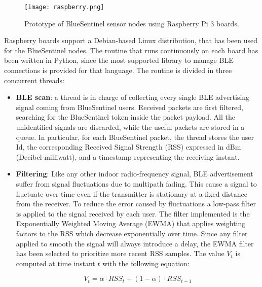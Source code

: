 \begin{figure}[h!tb]
\centering
\texttt{[image: raspberry.png]}
\caption[Prototype of BlueSentinel sensor nodes using Raspberry Pi 3 boards.]{Prototype of BlueSentinel sensor nodes using Raspberry Pi 3 boards.}
\label{fig:raspberry}
\end{figure}

Raspberry boards support a Debian-based Linux distribution, that has been used for the BlueSentinel nodes. The routine that runs continuously on each board has been written in Python, since the most supported library to manage BLE connections is provided for that language. The routine is divided in three concurrent threads:

\begin{itemize}
\item \textbf{BLE scan}: a thread is in charge of collecting every single BLE advertising signal coming from BlueSentinel users. Received packets are first filtered, searching for the BlueSentinel token inside the packet payload. All the unidentified signals are discarded, while the useful packets are stored in a queue. In particular, for each BlueSentinel packet, the thread stores the user Id, the corresponding Received Signal Strength (RSS) expressed in dBm (Decibel-milliwatt), and a timestamp representing the receiving instant.
\item \textbf{Filtering}: Like any other indoor radio-frequency signal, BLE advertisement suffer from signal fluctuations due to multipath fading. This cause a signal to fluctuate over time even if the transmitter is stationary at a fixed distance from the receiver. To reduce the error caused by fluctuations a low-pass filter is applied to the signal received by each user. The filter implemented is the Exponentially Weighted Moving Average (EWMA) that applies weighting factors to the RSS which decrease exponentially over time. Since any filter applied to smooth the signal will always introduce a delay, the EWMA filter has been selected to prioritize more recent RSS samples. The value $V_t$ is computed at time instant $t$ with the following equation:

\begin{equation}\label{eq:filter}
V_t = \alpha \cdot RSS_t + (1 - \alpha) \cdot RSS_{t-1}
\end{equation}


\end{itemize}
